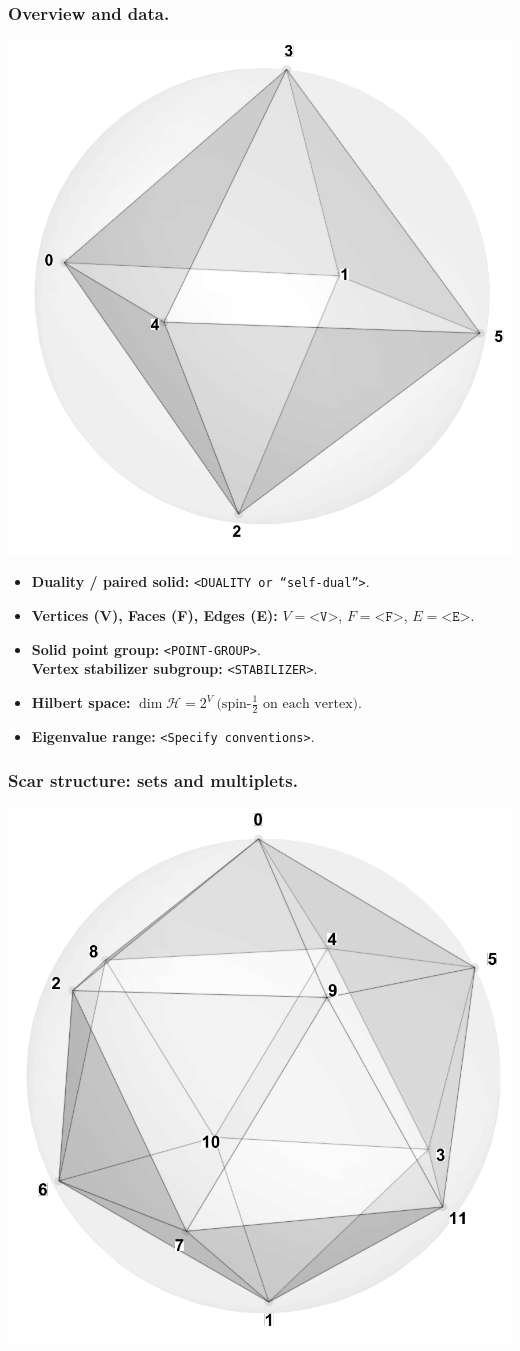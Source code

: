 \documentclass[11pt,a4paper]{article}
\begin{document}
\subsubsection*{Overview and data.}
\begin{center}
  \includegraphics[width=.6\linewidth]{octahedron}
\end{center}

\begin{itemize}[leftmargin=1.5em]
  \item \textbf{Duality / paired solid:} \texttt{<DUALITY or “self-dual”>}.
  \item \textbf{Vertices (V), Faces (F), Edges (E):} $V=\texttt{<V>}$,\; $F=\texttt{<F>}$,\; $E=\texttt{<E>}$.
  \item \textbf{Solid point group:} \texttt{<POINT-GROUP>}.\\
        \textbf{Vertex stabilizer subgroup:} \texttt{<STABILIZER>}.
  \item \textbf{Hilbert space:} \(
        \dim\mathcal{H} = 2^{V}\ \text{(spin-$\tfrac12$ on each vertex).}
        \)
  \item \textbf{Eigenvalue range:} \texttt{<Specify conventions>}.
\end{itemize}

\subsubsection*{Scar structure: sets and multiplets.}
\begin{center}
  \includegraphics[width=.6\linewidth]{icosahedron}
\end{center}
\end{document}
